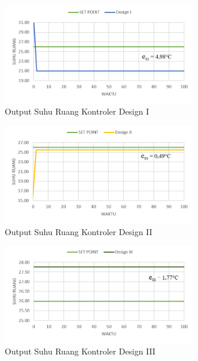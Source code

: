 \begin{figure}[!h]
	\centering
	\includegraphics[width=0.75\textwidth]{figures/ControlComparisonTd1}
	\caption{Output Suhu Ruang Kontroler Design I}
	\label{fig:5:ControlComparisonTd1}
\end{figure}
\vspace{1em}

\begin{figure}[!h]
	\centering
	\includegraphics[width=0.75\textwidth]{figures/ControlComparisonTd2}
	\caption{Output Suhu Ruang Kontroler Design II}
	\label{fig:5:ControlComparisonTd2}
\end{figure}
\vspace{1em}

\break

\begin{figure}[!h]
	\centering
	\includegraphics[width=0.75\textwidth]{figures/ControlComparisonTd3}
	\caption{Output Suhu Ruang Kontroler Design III}
	\label{fig:5:ControlComparisonTd3}
\end{figure}
\vspace{1em}

